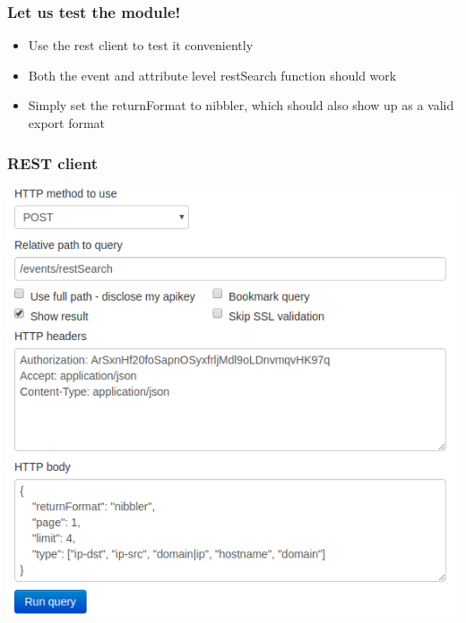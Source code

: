 \begin{frame}[fragile]
  \frametitle{Let us test the module!}
  \begin{itemize}
    \item Use the rest client to test it conveniently
    \item Both the event and attribute level restSearch function should work
    \item Simply set the returnFormat to nibbler, which should also show up as a valid export format
  \end{itemize}
\end{frame}

\begin{frame}
  \frametitle{REST client}
  \begin{center}
    \includegraphics[scale=0.5]{nibbler_rest_client.png}
  \end{center}
\end{frame}


